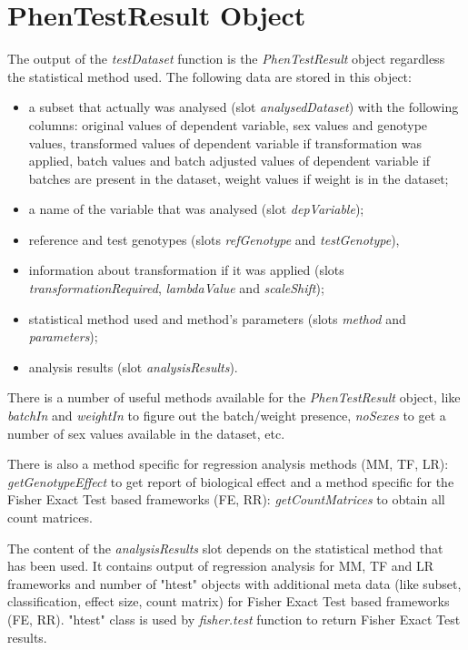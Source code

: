 \documentclass[12pt,a4paper]{article}
\begin{document}
\section{PhenTestResult Object}
The output of the \textit{testDataset} function is the \textit{PhenTestResult} object regardless the statistical method used. The following data are stored in this object:
\begin{itemize}
\item a subset that actually was analysed (slot \textit{analysedDataset}) with the following columns: original values of dependent variable, sex values and genotype values, transformed values of dependent variable if transformation was applied, batch values and batch adjusted values of dependent variable if batches are present in the dataset, weight values if weight is in the dataset;
\item a name of the variable that was analysed (slot \textit{depVariable});
\item reference and test genotypes (slots \textit{refGenotype} and \textit{testGenotype}), 
\item information about transformation if it was applied (slots \textit{transformationRequired}, \textit{lambdaValue} and \textit{scaleShift});
\item statistical method used and method's parameters (slots \textit{method} and \textit{parameters});
\item analysis results (slot \textit{analysisResults}).
\end{itemize} 

There is a number of useful methods available for the \textit{PhenTestResult} object, like \textit{batchIn} and \textit{weightIn} to figure out the batch/weight presence, \textit{noSexes} to get a number of sex values available in the dataset, etc.

There is also a method specific for regression analysis methods (MM, TF, LR): \textit{getGenotypeEffect} to get report of biological effect and a method specific for the Fisher Exact Test based frameworks (FE, RR): \textit{getCountMatrices} to obtain all count matrices.

The content of the \textit{analysisResults} slot depends on the statistical method that has been used. It contains output of regression analysis for MM, TF and LR frameworks and number of "htest" objects with additional meta data (like subset, classification, effect size, count matrix) for  
Fisher Exact Test based frameworks (FE, RR). "htest" class  is used by \textit{fisher.test} function to return Fisher Exact Test results.
\end{document}

